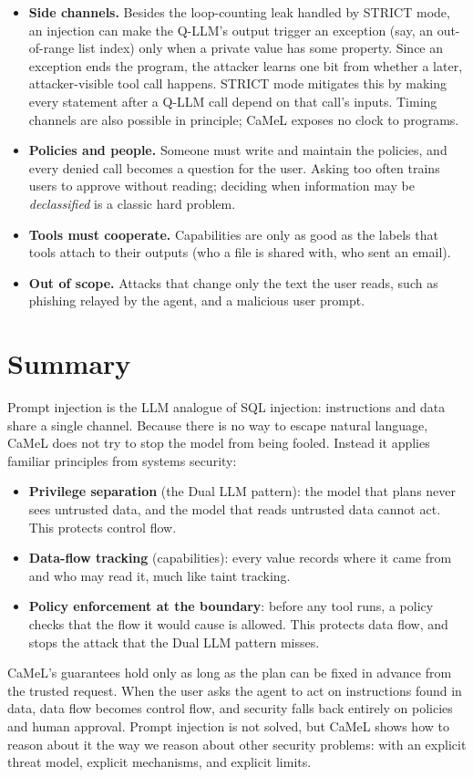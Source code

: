 \begin{itemize}
\item \textbf{Side channels.} Besides the loop-counting leak handled by
  STRICT mode, an injection can make the Q-LLM's output trigger an
  exception (say, an out-of-range list index) only when a private value
  has some property. Since an exception ends the program, the attacker
  learns one bit from whether a later, attacker-visible tool call
  happens. STRICT mode mitigates this by making every statement after a
  Q-LLM call depend on that call's inputs. Timing channels are also
  possible in principle; CaMeL exposes no clock to programs.
\item \textbf{Policies and people.} Someone must write and maintain the
  policies, and every denied call becomes a question for the user. Asking
  too often trains users to approve without reading; deciding when
  information may be \emph{declassified} is a classic hard problem.
\item \textbf{Tools must cooperate.} Capabilities are only as good as the
  labels that tools attach to their outputs (who a file is shared with,
  who sent an email).
\item \textbf{Out of scope.} Attacks that change only the text the user
  reads, such as phishing relayed by the agent, and a malicious user
  prompt.
\end{itemize}

\section{Summary}

Prompt injection is the LLM analogue of SQL injection: instructions and
data share a single channel.
Because there is no way to escape natural language, CaMeL does not try
to stop the model from being fooled.
Instead it applies familiar principles from systems security:
\begin{itemize}
\item \textbf{Privilege separation} (the Dual LLM pattern): the model
  that plans never sees untrusted data, and the model that reads
  untrusted data cannot act. This protects control flow.
\item \textbf{Data-flow tracking} (capabilities): every value records
  where it came from and who may read it, much like taint tracking.
\item \textbf{Policy enforcement at the boundary}: before any tool runs,
  a policy checks that the flow it would cause is allowed. This protects
  data flow, and stops the attack that the Dual LLM pattern misses.
\end{itemize}
CaMeL's guarantees hold only as long as the plan can be fixed in advance
from the trusted request. When the user asks the agent to act on
instructions found in data, data flow becomes control flow, and
security falls back entirely on policies and human approval.
Prompt injection is not solved, but CaMeL shows how to reason about it
the way we reason about other security problems: with an explicit threat
model, explicit mechanisms, and explicit limits.
